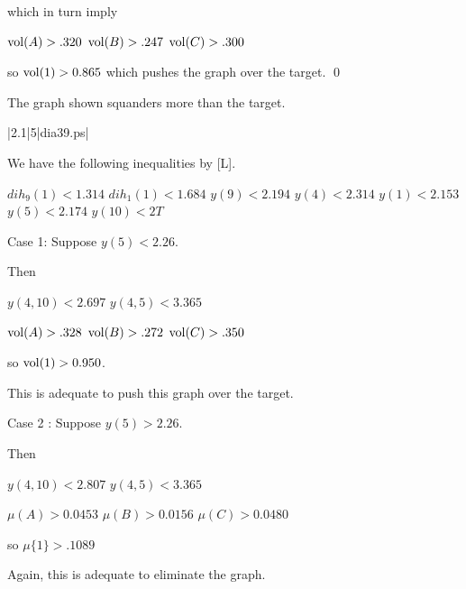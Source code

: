 which in turn imply

$\operatorname{vol}(A)>.320$ \newline
$\operatorname{vol}(B)>.247$ \newline
$\operatorname{vol}(C)>.300$ \newline

so $\operatorname{vol}(1)>0.865$ which pushes the graph over the target. \qed



\bigskip



 The graph shown 
squanders more than the target.  \endproclaim

\gram|2.1|5|dia39.ps|  %


We have the following inequalities by [L].

$dih_9(1) < 1.314$ \newline
$dih_1(1) < 1.684$ \newline
$y(9)<2.194$ \newline
$y(4)<2.314$ \newline
$y(1)<2.153$ \newline
$y(5)<2.174$ \newline
$y(10)<2T$ \newline


Case 1: Suppose $y(5)<2.26$.

Then 

$y(4,10)<2.697$ \newline
$y(4,5)<3.365$ \newline

$\operatorname{vol}(A)>.328$ \newline
$\operatorname{vol}(B)>.272$ \newline
$\operatorname{vol}(C)>.350$ \newline

so $\operatorname{vol}(1)>0.950$.  

This is adequate to push this graph over the target.

Case 2 : Suppose $y(5)>2.26$.

Then

$y(4,10)<2.807$ \newline
$y(4,5)<3.365$ \newline

$\mu(A)>0.0453$ \newline
$\mu(B)>0.0156$ \newline
$\mu(C)>0.0480$ \newline

so $\mu\{1\}>.1089$

Again, this is adequate to eliminate the graph.

